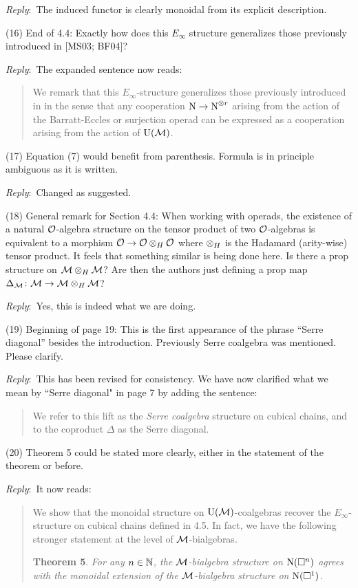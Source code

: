 \documentclass{amsart}
\newcommand{\ar}{\medskip\noindent\textit{Reply}:\ }
\newcommand{\rp}{\medskip\noindent}
\begin{document}
	\ar The induced functor is clearly monoidal from its explicit description.

	\rp (16) End of 4.4: Exactly how does this $E_\infty$ structure generalizes those previously introduced in [MS03; BF04]?

	\ar The expanded sentence now reads:

	\begin{quote}
		We remark that this $E_\infty$-structure generalizes those previously introduced in \cite{mcclure2003multivariable,berger2004combinatorial} in the sense that any cooperation $\operatorname{N} \to \operatorname{N}^{\otimes r}$ arising from the action of the Barratt-Eccles or surjection operad can be expressed as a cooperation arising from the action of ${\operatorname{U}(\mathcal{M})}$.
	\end{quote}

	\rp (17) Equation (7) would benefit from parenthesis. Formula is in principle ambiguous as it is written.

	\ar Changed as suggested.

	\rp (18) General remark for Section 4.4: When working with operads, the existence of a natural $\mathcal{O}$-algebra structure on the tensor product of two $\mathcal{O}$-algebras is equivalent to a morphism $\mathcal{O} \to \mathcal{O} \otimes_H \mathcal{O}$ where $\otimes_H$ is the Hadamard (arity-wise) tensor product.
	It feels that something similar is being done here.
	Is there a prop structure on $\mathcal{M} \otimes_H \mathcal{M}$? Are then the authors just defining a prop map $\Delta_{\mathcal{M}} \colon \mathcal{M} \to \mathcal{M} \otimes_H \mathcal{M}$?

	\ar Yes, this is indeed what we are doing.

	\rp (19) Beginning of page 19: This is the first appearance of the phrase “Serre diagonal” besides the introduction.
	Previously Serre coalgebra was mentioned.
	Please clarify.

	\ar This has been revised for consistency. We have now clarified what we mean by ``Serre diagonal" in page 7 by adding the sentence:
    \begin{quote}
        We refer to this lift as the \textit{Serre coalgebra} structure on cubical chains, and to the coproduct $\Delta$ as the Serre diagonal.
    \end{quote}

	(20) Theorem 5 could be stated more clearly, either in the statement of the theorem or before.

	\ar It now reads:
	\begin{quote}
		We show that the monoidal structure on ${\operatorname{U}(\mathcal{M})}$-coalgebras recover the $E_\infty$-structure on cubical chains defined in 4.5.
		In fact, we have the following stronger statement at the level of $\mathcal{M}$-bialgebras.

		\medskip\noindent\textbf{Theorem 5}.
		\textit{For any $n \in \mathbb{N}$, the $\mathcal{M}$-bialgebra structure on $\operatorname{N}(\square^n)$ agrees with the monoidal extension of the $\mathcal{M}$-bialgebra structure on $\operatorname{N}(\square^1)$.}
	\end{quote}
\end{document}
